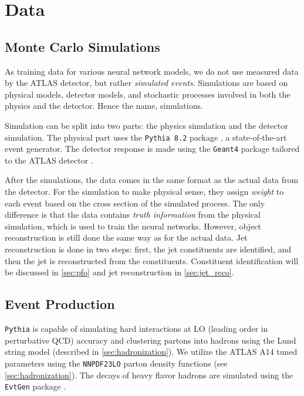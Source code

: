 \chapter{Data}
\label{ch:data}

\section{Monte Carlo Simulations}
\label{sec:mc_simluation}
As training data for various neural network models, we do not use measured data by the ATLAS detector, but rather \emph{simulated events}. 
Simulations are based on physical models, detector models, and stochastic processes involved in both the physics and the detector.
Hence the name, \MC simulations.

Simulation can be split into two parts: the physics simulation and the detector simulation.
The physical part uses the \texttt{Pythia 8.2} package \cite{pythia}, a state-of-the-art event generator.
The detector response is made using the \texttt{Geant4} package \cite{geant4} tailored to the ATLAS detector \cite{atlas_sym}.

After the simulations, the \MC data comes in the same format as the actual data from the detector.
For the simulation to make physical sense, they assign \emph{weight} to each event based on the cross section of the simulated process.
The only difference is that the \MC data contains \emph{truth information} from the physical simulation, which is used to train the neural networks.
However, object reconstruction is still done the same way as for the actual data.
Jet reconstruction is done in two steps: first, the jet constituents are identified, and then the jet is reconstructed from the constituents. 
Constituent identification will be discussed in \cref{sec:pfo} and jet reconstruction in \cref{sec:jet_reco}.

\section{Event Production}
\label{sec:event_production}
\texttt{Pythia} is capable of simulating hard interactions at LO (leading order in perturbative QCD) accuracy and clustering partons into hadrons using the Lund string model (described in \cref{sec:hadronization}).
We utilize the ATLAS A14 tuned parameters \cite{atlas_A14_tunes} using the \texttt{NNPDF23LO} \cite{NNPDF23LO} parton density functions (see \cref{sec:hadronization}).
The decays of heavy flavor hadrons are simulated using the \texttt{EvtGen} package \cite{EvtGen}.

